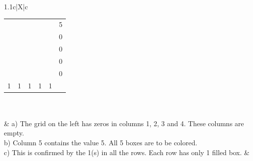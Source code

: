 \documentclass[a4paper]{exam}
\begin{document}
\begin{questions}
\begin{tabularx}{1.1\linewidth}{c|X|c}
{\begin{tabular}{|*5{c|}c}
      \cellcolor{gray} & \cellcolor{gray} & \cellcolor{gray} & \cellcolor{gray} & \cellcolor{gray} & 5\\\cline{1-5}
                       & & & & & 0\\\cline{1-5}
                       & & & & & 0\\\cline{1-5}
                       & & & & & 0\\\cline{1-5}
                       & & & & & 0\\\cline{1-5}
      \multicolumn{1}{c}{1} & \multicolumn{1}{c}{1} & \multicolumn{1}{c}{1} & \multicolumn{1}{c}{1} & \multicolumn{1}{c}{1} & 
    \end{tabular}}

  \\\hline
  \\
  &
  {\footnotesize
    a) The grid on the left has zeros in columns 1, 2, 3 and 4. These columns are empty.\newline
    b) Column 5 contains the value 5. All 5 boxes are to be colored.\newline
    c) This is confirmed by the 1(s) in all the rows. Each row has only 1 filled box.}
  &


\end{tabularx}
\end{questions}
\end{document}
